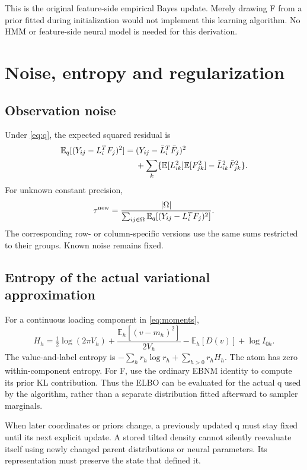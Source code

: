 \documentclass[11pt,a4paper]{article}
\newcommand{\E}{\mathbb E}
\begin{document}
This is the original feature-side empirical Bayes update. Merely drawing F
from a prior fitted during initialization would not implement this learning
algorithm. No HMM or feature-side neural model is needed for this derivation.

\clearpage
\section{Noise, entropy and regularization}
\subsection{Observation noise}
Under \eqref{eq:q}, the expected squared residual is
\begin{align}
\E_q[(Y_{ij}-L_i^TF_j)^2]
={}&(Y_{ij}-\bar L_i^T\bar F_j)^2\notag\\
&+\sum_k\{\E[L_{ik}^2]\E[F_{jk}^2]-\bar L_{ik}^2\bar F_{jk}^2\}.
\label{eq:residual}
\end{align}
For unknown constant precision,
\begin{equation}
\tau^{\rm new}=\frac{|\Omega|}
{\sum_{ij\in\Omega}\E_q[(Y_{ij}-L_i^TF_j)^2]}.
\label{eq:noise}
\end{equation}
The corresponding row- or column-specific versions use the same sums
restricted to their groups. Known noise remains fixed.

\subsection{Entropy of the actual variational approximation}
For a continuous loading component in \eqref{eq:moments},
\begin{equation}
H_h=\tfrac12\log(2\pi V_h)
+\frac{\E_h[(v-m_h)^2]}{2V_h}-\E_h[D(v)]+\log I_{0h}.
\label{eq:entropy}
\end{equation}
The value-and-label entropy is
\(-\sum_hr_h\log r_h+\sum_{h>0}r_hH_h\). The atom has zero
within-component entropy. For F, use the ordinary EBNM identity to compute
its prior KL contribution. Thus the ELBO can be evaluated for the actual
q used by the algorithm, rather than a separate distribution fitted
afterward to sampler marginals.

When later coordinates or priors change, a previously updated q must stay
fixed until its next explicit update. A stored tilted density cannot silently
reevaluate itself using newly changed parent distributions or neural
parameters. Its representation must preserve the state that defined it.
\end{document}
